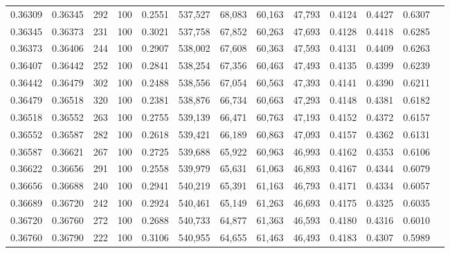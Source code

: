 \begin{tabular}{rrrrrrrrrrrrr}
0.36309 & 0.36345 &   292 & 100 &                                     0.2551 & 537,527 &  68,083 &  60,163 &  47,793 & 0.4124 & 0.4427 & 0.6307 \\
0.36345 & 0.36373 &   231 & 100 &                                     0.3021 & 537,758 &  67,852 &  60,263 &  47,693 & 0.4128 & 0.4418 & 0.6285 \\
0.36373 & 0.36406 &   244 & 100 &                                     0.2907 & 538,002 &  67,608 &  60,363 &  47,593 & 0.4131 & 0.4409 & 0.6263 \\
0.36407 & 0.36442 &   252 & 100 &                                     0.2841 & 538,254 &  67,356 &  60,463 &  47,493 & 0.4135 & 0.4399 & 0.6239 \\
0.36442 & 0.36479 &   302 & 100 &                                     0.2488 & 538,556 &  67,054 &  60,563 &  47,393 & 0.4141 & 0.4390 & 0.6211 \\
0.36479 & 0.36518 &   320 & 100 &                                     0.2381 & 538,876 &  66,734 &  60,663 &  47,293 & 0.4148 & 0.4381 & 0.6182 \\
0.36518 & 0.36552 &   263 & 100 &                                     0.2755 & 539,139 &  66,471 &  60,763 &  47,193 & 0.4152 & 0.4372 & 0.6157 \\
0.36552 & 0.36587 &   282 & 100 &                                     0.2618 & 539,421 &  66,189 &  60,863 &  47,093 & 0.4157 & 0.4362 & 0.6131 \\
0.36587 & 0.36621 &   267 & 100 &                                     0.2725 & 539,688 &  65,922 &  60,963 &  46,993 & 0.4162 & 0.4353 & 0.6106 \\
0.36622 & 0.36656 &   291 & 100 &                                     0.2558 & 539,979 &  65,631 &  61,063 &  46,893 & 0.4167 & 0.4344 & 0.6079 \\
0.36656 & 0.36688 &   240 & 100 &                                     0.2941 & 540,219 &  65,391 &  61,163 &  46,793 & 0.4171 & 0.4334 & 0.6057 \\
0.36689 & 0.36720 &   242 & 100 &                                     0.2924 & 540,461 &  65,149 &  61,263 &  46,693 & 0.4175 & 0.4325 & 0.6035 \\
0.36720 & 0.36760 &   272 & 100 &                                     0.2688 & 540,733 &  64,877 &  61,363 &  46,593 & 0.4180 & 0.4316 & 0.6010 \\
0.36760 & 0.36790 &   222 & 100 &                                     0.3106 & 540,955 &  64,655 &  61,463 &  46,493 & 0.4183 & 0.4307 & 0.5989 \\

\end{tabular}
